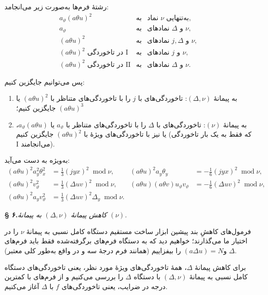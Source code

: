 \documentclass[11pt]{article}
\providecommand{\modu}[1]{\;\operatorname{mod} #1}
\begin{document}
رشتهٔ فرم‌ها به‌صورت زیر می‌انجامد:
\[
\begin{array}{rcl}
a_\vartheta(a\theta u)^2 &\text{به}& \text{نماد }\nu\text{ به‌تنهایی},\\[0.2em]
a_\vartheta &\text{به}& \text{نمادهای }\Delta\text{ و }\nu,\\[0.2em]
(a\theta u)^2 &\text{به}& \text{نمادهای }j,\Delta\text{ و }\nu,\\[0.2em]
(a\theta u)^2\text{ در تاخوردگی I} &\text{به}& \text{نمادهای }j\text{ و }\nu,\\[0.2em]
(a\theta u)^2\text{ در تاخوردگی II} &\text{به}& \text{نمادهای }\Delta\text{ و }\nu.
\end{array}
\]

پس می‌توانیم جایگزین کنیم:
\begingroup
\renewcommand{\labelenumi}{\arabic{enumi})}
\begin{enumerate}
\item به پیمانهٔ $(\Delta,\nu)$: تاخوردگی‌های با $j$ را با تاخوردگی‌های متناظر با $(a\theta u)^2$ یا $(a\theta u)^3$ جایگزین کنیم؛
\item به پیمانهٔ $(\nu)$: تاخوردگی‌های با $\Delta$ را با تاخوردگی‌های متناظر با $a_\vartheta$ یا $a_\vartheta(a\theta u)$، یا نیز با تاخوردگی‌های ویژهٔ با $(a\theta u)^2$ جایگزین کنیم (که فقط به یک بار تاخوردگی I می‌انجامند).
\end{enumerate}
\endgroup
به‌ویژه به دست می‌آید:
\[
\begin{aligned}
(a\theta u)^2a_y^2\theta_x^2&=\frac13(jyx)^2\modu{\nu},&
(a\theta u)^2a_y\theta_y&=-\frac16(jyx)^2\modu{\nu},\\[0.4em]
(a\theta u)^2v_\vartheta^2&=\frac13(\Delta uv)^2\modu{\nu},&
(a\theta u)(a\theta v)u_\vartheta v_\vartheta&=-\frac16(\Delta uv)^2\modu{\nu},\\[0.4em]
(a\theta u)^2a_yv_\vartheta^2&=\frac13(\Delta uv)^2\Delta_y\modu{\nu}.
\end{aligned}
\]

\begin{center}
\textbf{§ ۶.}\quad\emph{کاهش پیمانهٔ $(\Delta,\nu)$ به پیمانهٔ $(\nu)$.}
\end{center}

فرمول‌های کاهشِ بند پیشین ابزار ساخت مستقیم دستگاه کامل نسبی به پیمانهٔ $\nu$ را در اختیار ما می‌گذارند؛ خواهیم دید که به دستگاه فرم‌های برگرفته‌شده فقط باید فرم‌های $\Delta$ و$(a\Delta u)=N$ را بیفزاییم (همانند فرم درجهٔ سه و در واقع به‌طور کلی معتبر).

برای کاهش پیمانهٔ $\Delta$، همهٔ تاخوردگی‌های ویژهٔ مورد نظر، یعنی تاخوردگی‌های دستگاه کامل نسبی به پیمانهٔ $(\Delta,\nu)$ با دستگاه $\Delta$ را بررسی می‌کنیم و از فرم‌های با کمترین درجه در ضرایب، یعنی تاخوردگی‌های $f$ با $\Delta$ آغاز می‌کنیم.
\end{document}

